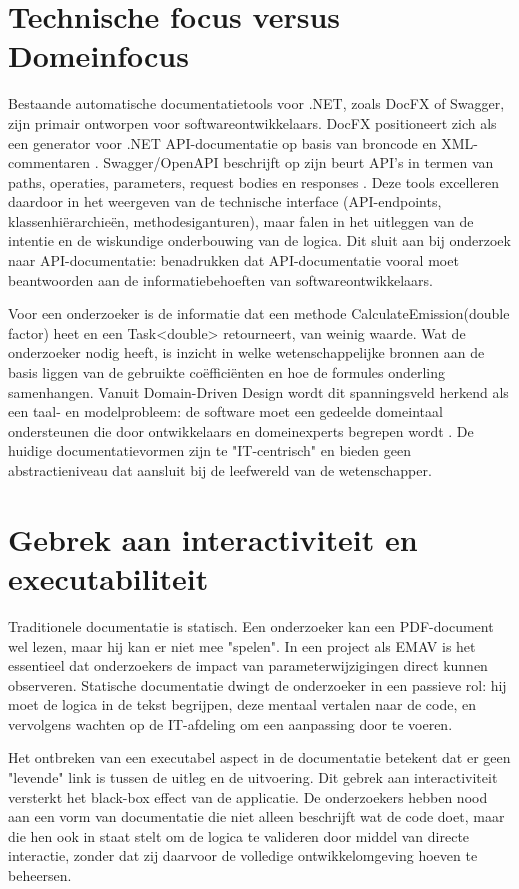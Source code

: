 \section{Technische focus versus Domeinfocus}
Bestaande automatische documentatietools voor .NET, zoals DocFX of Swagger, zijn primair ontworpen voor softwareontwikkelaars. DocFX positioneert zich als een generator voor .NET API-documentatie op basis van broncode en XML-commentaren \autocite{docfx}. Swagger/OpenAPI beschrijft op zijn beurt API's in termen van paths, operaties, parameters, request bodies en responses \autocite{swaggerPathsOperations}. Deze tools excelleren daardoor in het weergeven van de technische interface (API-endpoints, klassenhiërarchieën, methodesiganturen), maar falen in het uitleggen van de intentie en de wiskundige onderbouwing van de logica. Dit sluit aan bij onderzoek naar API-documentatie: \textcite{meng2018apiDocumentation} benadrukken dat API-documentatie vooral moet beantwoorden aan de informatiebehoeften van softwareontwikkelaars.

Voor een onderzoeker is de informatie dat een methode CalculateEmission(double factor) heet en een Task<double> retourneert, van weinig waarde. Wat de onderzoeker nodig heeft, is inzicht in welke wetenschappelijke bronnen aan de basis liggen van de gebruikte coëfficiënten en hoe de formules onderling samenhangen. Vanuit Domain-Driven Design wordt dit spanningsveld herkend als een taal- en modelprobleem: de software moet een gedeelde domeintaal ondersteunen die door ontwikkelaars en domeinexperts begrepen wordt \autocite{Khononov2022}. De huidige documentatievormen zijn te "IT-centrisch" en bieden geen abstractieniveau dat aansluit bij de leefwereld van de wetenschapper.

\section{Gebrek aan interactiviteit en executabiliteit}
Traditionele documentatie is statisch. Een onderzoeker kan een PDF-document wel lezen, maar hij kan er niet mee "spelen". In een project als EMAV is het essentieel dat onderzoekers de impact van parameterwijzigingen direct kunnen observeren. Statische documentatie dwingt de onderzoeker in een passieve rol: hij moet de logica in de tekst begrijpen, deze mentaal vertalen naar de code, en vervolgens wachten op de IT-afdeling om een aanpassing door te voeren.

Het ontbreken van een executabel aspect in de documentatie betekent dat er geen "levende" link is tussen de uitleg en de uitvoering. Dit gebrek aan interactiviteit versterkt het black-box effect van de applicatie. De onderzoekers hebben nood aan een vorm van documentatie die niet alleen beschrijft wat de code doet, maar die hen ook in staat stelt om de logica te valideren door middel van directe interactie, zonder dat zij daarvoor de volledige ontwikkelomgeving hoeven te beheersen.

